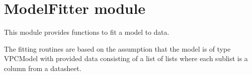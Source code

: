 \documentclass[letterpaper,10pt,english]{sphinxmanual}
\begin{document}
\sphinxstepscope


\chapter{ModelFitter module}
\label{\detokenize{ModelFitter:module-src.ModelFitter}}\label{\detokenize{ModelFitter:modelfitter-module}}\label{\detokenize{ModelFitter::doc}}
\sphinxAtStartPar
This module provides functions to fit a model to data.

\sphinxAtStartPar
The fitting routines are based on the assumption that the model is of type VPCModel
with provided data consisting of a list of lists where each sub\sphinxhyphen{}list is a column from a datasheet.
\end{document}
